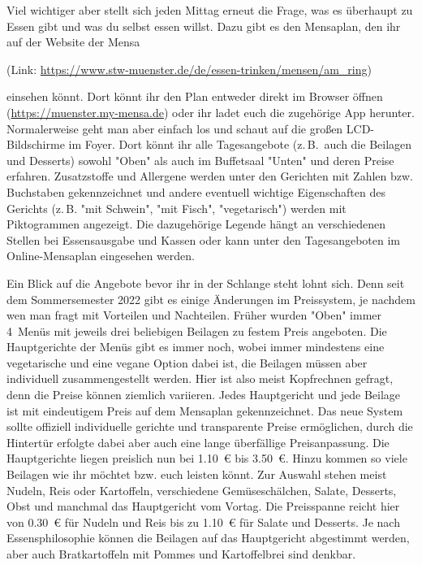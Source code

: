 \begin{multicols}{2}
Viel wichtiger aber stellt sich jeden Mittag erneut die Frage, was es überhaupt zu Essen gibt und was du selbst essen willst.
Dazu gibt es den Mensaplan, den ihr auf der Website der Mensa

\begin{center}
	(Link:
	\url{https://www.stw-muenster.de/de/essen-trinken/mensen/am_ring})
\end{center}

einsehen könnt. Dort könnt ihr den Plan entweder direkt im Browser öffnen (\url{https://muenster.my-mensa.de}) oder ihr ladet euch die zugehörige App herunter. Normalerweise geht man aber einfach los und schaut auf die
großen LCD-Bildschirme im Foyer. Dort könnt ihr alle Tagesangebote (z.\,B.\ auch die Beilagen und Desserts) sowohl "Oben" als auch im Buffetsaal "Unten" und deren Preise erfahren. Zusatzstoffe und Allergene werden unter den Gerichten mit Zahlen bzw. Buchstaben gekennzeichnet und andere eventuell wichtige Eigenschaften des Gerichts (z.\,B. "mit Schwein", "mit Fisch", "vegetarisch") werden mit Piktogrammen angezeigt. Die dazugehörige Legende hängt an verschiedenen Stellen bei Essensausgabe und Kassen oder kann unter den Tagesangeboten im Online-Mensaplan eingesehen werden.

Ein Blick auf die Angebote bevor ihr in der Schlange steht lohnt sich. Denn seit dem Sommersemester 2022 gibt es einige Änderungen im Preissystem, je nachdem wen man fragt mit Vorteilen und Nachteilen. Früher wurden "Oben" immer 4~Menüs mit jeweils drei beliebigen Beilagen zu festem Preis angeboten. Die Hauptgerichte der Menüs gibt es immer noch, wobei immer mindestens eine vegetarische und eine vegane Option dabei ist, die Beilagen müssen aber individuell zusammengestellt werden. Hier ist also meist Kopfrechnen gefragt, denn die Preise können ziemlich variieren. Jedes Hauptgericht und jede Beilage ist mit eindeutigem Preis auf dem Mensaplan gekennzeichnet. Das neue System sollte offiziell individuelle gerichte und transparente Preise ermöglichen, durch die Hintertür erfolgte dabei aber auch eine lange überfällige Preisanpassung.
Die Hauptgerichte liegen preislich nun bei \SI{1,10}{\euro} bis \SI{3,50}{\euro}. Hinzu kommen so viele Beilagen wie ihr möchtet bzw. euch leisten könnt. Zur Auswahl stehen meist Nudeln, Reis oder Kartoffeln, verschiedene Gemüseschälchen, Salate, Desserts, Obst und manchmal das Hauptgericht vom Vortag. Die Preisspanne reicht hier von \SI{0,30}{\euro} für Nudeln und Reis bis zu \SI{1,10}{\euro} für Salate und Desserts. Je nach Essensphilosophie können die Beilagen auf das Hauptgericht abgestimmt werden, aber auch Bratkartoffeln mit Pommes und Kartoffelbrei sind denkbar.


\end{multicols}
